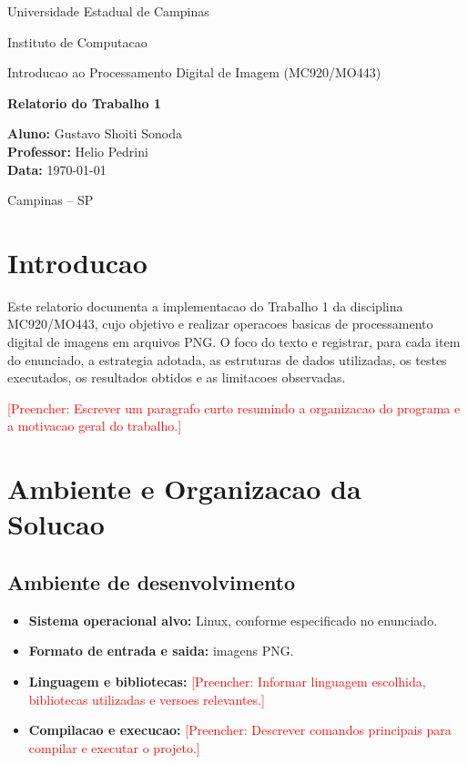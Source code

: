 \documentclass[12pt,a4paper]{article}
\newcommand{\placeholder}[1]{\textcolor{red}{[Preencher: #1]}}
\begin{document}
\begin{titlepage}
  \centering
  {\large Universidade Estadual de Campinas\par}
  {\large Instituto de Computacao\par}
  \vspace{1.5cm}
  {\Large Introducao ao Processamento Digital de Imagem (MC920/MO443)\par}
  \vspace{0.5cm}
  {\LARGE \textbf{Relatorio do Trabalho 1}\par}
  \vspace{1.5cm}

  \begin{flushleft}
    \textbf{Aluno:} Gustavo Shoiti Sonoda\\
    \textbf{Professor:} Helio Pedrini\\
    \textbf{Data:} \today
  \end{flushleft}

  \vfill
  {\large Campinas -- SP\par}
\end{titlepage}

\tableofcontents
\newpage

\section{Introducao}

Este relatorio documenta a implementacao do Trabalho 1 da disciplina MC920/MO443, cujo objetivo e realizar operacoes basicas de processamento digital de imagens em arquivos PNG. O foco do texto e registrar, para cada item do enunciado, a estrategia adotada, as estruturas de dados utilizadas, os testes executados, os resultados obtidos e as limitacoes observadas.

\placeholder{Escrever um paragrafo curto resumindo a organizacao do programa e a motivacao geral do trabalho.}

\section{Ambiente e Organizacao da Solucao}

\subsection{Ambiente de desenvolvimento}

\begin{itemize}[leftmargin=*]
  \item \textbf{Sistema operacional alvo:} Linux, conforme especificado no enunciado.
  \item \textbf{Formato de entrada e saida:} imagens PNG.
  \item \textbf{Linguagem e bibliotecas:} \placeholder{Informar linguagem escolhida, bibliotecas utilizadas e versoes relevantes.}
  \item \textbf{Compilacao e execucao:} \placeholder{Descrever comandos principais para compilar e executar o projeto.}
\end{itemize}
\end{document}
